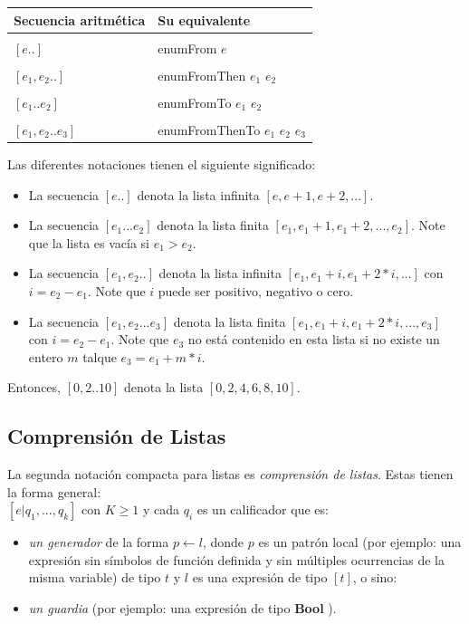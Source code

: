 \documentclass[10pt,journal,compsoc]{IEEEtran}
\begin{document}
\begin{tabular}{ l | l }
	\hline
	Secuencia aritm\'etica & Su equivalente \\
	\hline\\
	$[e..]$ & enumFrom $e$\\
	\hline\\
	$[e_{1},e_{2}..]$ & enumFromThen $e_{1}$ $e_{2}$ \\
	\hline\\
	$[e_{1}..e_{2}]$ & enumFromTo $e_{1}$ $e_{2}$\\
	\hline\\
	$[e_{1},e_{2}..e_{3}]$ & enumFromThenTo $e_{1}$ $e_{2}$ $e_{3}$\\
	\hline
\end{tabular}

Las diferentes notaciones tienen el siguiente significado: \\
\begin{itemize}
	\item La secuencia $[e..]$ denota la lista infinita $[e,e+1,e+2,...]$.
	\item La secuencia $[e_{1}...e_{2}]$ denota la lista finita $[e_{1},e_{1}+1,e_{1}+2,...,e_{2}]$. Note que la lista es vac\'ia si $e_{1} > e_{2}$.
	\item La secuencia $[e_{1},e_{2}..]$ denota la lista infinita $[e_{1},e_{1}+i,e_{1}+2*i,...]$ con $i = e_{2} - e_{1}$. Note que $i$ puede ser positivo, negativo o cero.
	\item La secuencia $[e_{1},e_{2}...e_{3}]$ denota la lista finita  $[e_{1},e_{1}+i,e_{1}+2*i,...,e_{3}]$ con $i = e_{2} - e_{1}$. Note que $e_{3}$ no est\'a contenido en esta lista si no existe un entero $m$ talque $e_{3} = e_{1} + m * i$.
\end{itemize}
Entonces, $[0, 2 .. 10]$ denota la lista $[0, 2, 4, 6 ,8, 10]$.

\subsection{Comprensi\'on de Listas}
La segunda notaci\'on compacta para listas es \emph{comprensi\'on de listas}. Estas tienen la forma general: \\ $[e | q_{1}, ..., q_{k}]$ con $K \ge 1$ y cada $q_{i}$ es un calificador que es: \\
\begin{itemize}
	\item \emph{un generador} de la forma $ p \leftarrow l $, donde $p$ es un patr\'on local (por ejemplo: una expresi\'on sin s\'imbolos de funci\'on definida y sin m\'ultiples ocurrencias de la misma variable) de tipo $t$ y $l$ es una expresi\'on de tipo $[t]$, o sino:
	\item \emph{un guardia} (por ejemplo: una expresi\'on de tipo \textbf{Bool} ).
\end{itemize}
\end{document}
